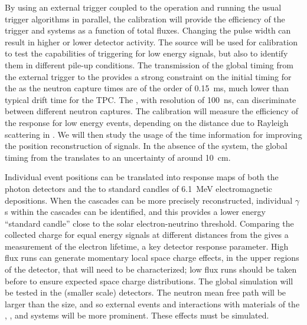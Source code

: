 By using an external trigger coupled to the  operation and running the usual trigger algorithms in parallel, the calibration will provide the efficiency of the trigger and  systems as a function of total fluxes. Changing the pulse width can result in 
higher or lower detector activity. The source will be used for  calibration to test
the capabilities of triggering for low energy signals, but also 
to identify them in different pile-up conditions.
The transmission of the global timing from the external  trigger to the  provides a strong constraint on the initial timing for the 
as the neutron capture times are of the order of \SI{0.15}{\milli\s}, much lower than typical drift time 
for the TPC. The , with resolution of \SI{100}{\nano\s}, can discriminate between different neutron captures. The calibration will measure the efficiency of the  response for low energy events, depending on the distance due to Rayleigh scattering in \lar. We will then study the usage of the  time information for improving the position reconstruction of  signals. In the absence of the  system, the global timing from the  translates to an uncertainty of around \SI{10}{\cm}.

Individual event positions can be translated into response maps of both the photon detectors and the  to standard candles of \SI{6.1}{\MeV} electromagnetic depositions. When the cascades can be more precisely reconstructed, individual $\gamma$s within the cascades can be identified, and this provides a lower energy ``standard candle'' close to the solar electron-neutrino threshold. Comparing the collected charge for equal energy signals at different distances from the  gives a measurement of the electron lifetime, a key detector response parameter. High  flux runs can generate momentary local space charge effects, in the 
upper regions of the detector, that will need to be characterized; low flux runs should be taken before to ensure %
expected space charge distributions.
The global simulation will be tested in the (smaller scale)  detectors. The neutron mean free path will be larger than the  size, and so 
external events and interactions with materials of the , , and  systems will be more prominent. These effects must be simulated.

